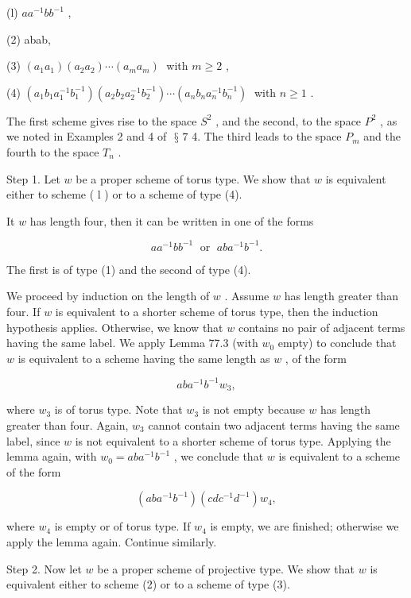 \documentclass[10pt]{article}
\begin{document}
(l) \(a{a}^{-1}b{b}^{-1}\) ,

(2) abab,

(3) \(\left( {{a}_{1}{a}_{1}}\right) \left( {{a}_{2}{a}_{2}}\right) \cdots \left( {{a}_{m}{a}_{m}}\right) \;\) with \(m \geq  2\) ,

(4) \(\left( {{a}_{1}{b}_{1}{a}_{1}^{-1}{b}_{1}^{-1}}\right) \left( {{a}_{2}{b}_{2}{a}_{2}^{-1}{b}_{2}^{-1}}\right) \cdots \left( {{a}_{n}{b}_{n}{a}_{n}^{-1}{b}_{n}^{-1}}\right) \;\) with \(n \geq  1\) .

The first scheme gives rise to the space \({S}^{2}\) , and the second, to the space \({P}^{2}\) , as we noted in Examples 2 and 4 of \(\text{ § }7\) 4. The third leads to the space \({P}_{m}\) and the fourth to the space \({T}_{n}\) .

Step 1. Let \(w\) be a proper scheme of torus type. We show that \(w\) is equivalent either to scheme ( l ) or to a scheme of type (4).

It \(w\) has length four, then it can be written in one of the forms

\[
a{a}^{-1}b{b}^{-1}\;\text{ or }\;{ab}{a}^{-1}{b}^{-1}.
\]

The first is of type (1) and the second of type (4).

We proceed by induction on the length of \(w\) . Assume \(w\) has length greater than four. If \(w\) is equivalent to a shorter scheme of torus type, then the induction hypothesis applies. Otherwise, we know that \(w\) contains no pair of adjacent terms having the same label. We apply Lemma 77.3 (with \({w}_{0}\) empty) to conclude that \(w\) is equivalent to a scheme having the same length as \(w\) , of the form

\[
{ab}{a}^{-1}{b}^{-1}{w}_{3},
\]

where \({w}_{3}\) is of torus type. Note that \({w}_{3}\) is not empty because \(w\) has length greater than four. Again, \({w}_{3}\) cannot contain two adjacent terms having the same label, since \(w\) is not equivalent to a shorter scheme of torus type. Applying the lemma again, with \({w}_{0} = {ab}{a}^{-1}{b}^{-1}\) , we conclude that \(w\) is equivalent to a scheme of the form

\[
\left( {{ab}{a}^{-1}{b}^{-1}}\right) \left( {{cd}{c}^{-1}{d}^{-1}}\right) {w}_{4},
\]

where \({w}_{4}\) is empty or of torus type. If \({w}_{4}\) is empty, we are finished; otherwise we apply the lemma again. Continue similarly.

Step 2. Now let \(w\) be a proper scheme of projective type. We show that \(w\) is equivalent either to scheme (2) or to a scheme of type (3).
\end{document}
